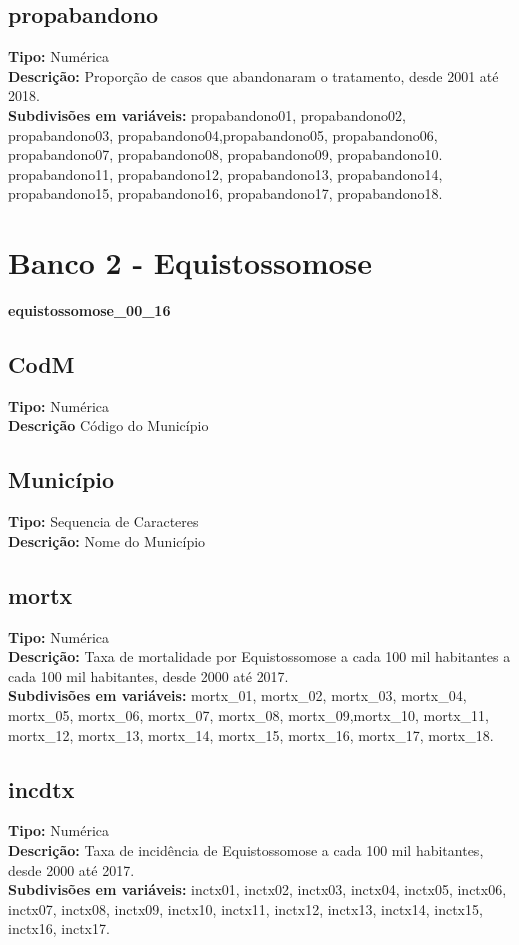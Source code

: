 \documentclass[12pt]{article}
\begin{document}
		\subsection{propabandono}
		{\bf Tipo:} Numérica \\
		{\bf Descrição:} Proporção de casos que abandonaram o tratamento, desde 2001 até 2018.\\
		{\bf Subdivisões em variáveis:} propabandono01, propabandono02, propabandono03, propabandono04,propabandono05,
		propabandono06, propabandono07, propabandono08, propabandono09, propabandono10. propabandono11, propabandono12,
		propabandono13, propabandono14, propabandono15, propabandono16, propabandono17, propabandono18.
		\section{Banco 2 - Equistossomose}
		{\bf equistossomose\_00\_16}
		\subsection{CodM}
		{\bf Tipo:} Numérica \\
		{\bf Descrição} Código do Município \\
		\subsection{Município}
		{\bf Tipo:} Sequencia de Caracteres \\
		{\bf Descrição:} Nome do Município 
		\subsection{mortx}
		{\bf Tipo:} Numérica \\
		{\bf Descrição:}  Taxa de mortalidade por Equistossomose a cada 100 mil habitantes a cada 100 mil habitantes, desde 2000 até 2017.\\
		{\bf Subdivisões em variáveis:} mortx\_01,  mortx\_02, mortx\_03, mortx\_04, mortx\_05, mortx\_06, mortx\_07, mortx\_08, mortx\_09,mortx\_10, mortx\_11, mortx\_12, mortx\_13, mortx\_14, mortx\_15, mortx\_16, mortx\_17, mortx\_18. \\
		\subsection{incdtx}
		{\bf Tipo:} Numérica \\
		{\bf Descrição:} Taxa de incidência de Equistossomose a cada 100 mil habitantes, desde 2000 até 2017.\\
		{\bf Subdivisões em variáveis:} inctx01, inctx02, inctx03, inctx04, inctx05, inctx06, inctx07, inctx08,
		inctx09, inctx10, inctx11, inctx12, inctx13, inctx14, inctx15, inctx16, inctx17. \\
\end{document}
